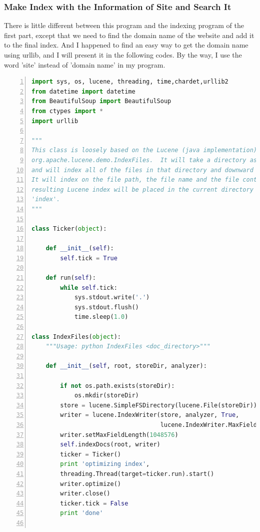 \documentclass{article}
\begin{document}
\subsubsection{Make Index with the Information of Site and Search It}
There is little different between this program and the indexing program of the first part, except that we need to find the domain name of the website and add it to the final index. And I happened to find an easy way to get the domain name using urllib, and I will present it in the following codes. By the way, I use the word 'site' instead of 'domain name' in my program.\\
\begin{lstlisting}[language=python,numbers=left,frame=leftline]
import sys, os, lucene, threading, time,chardet,urllib2
from datetime import datetime
from BeautifulSoup import BeautifulSoup
from ctypes import *
import urllib

"""
This class is loosely based on the Lucene (java implementation) demo class
org.apache.lucene.demo.IndexFiles.  It will take a directory as an argument
and will index all of the files in that directory and downward recursively.
It will index on the file path, the file name and the file contents.  The
resulting Lucene index will be placed in the current directory and called
'index'.
"""

class Ticker(object):

    def __init__(self):
        self.tick = True

    def run(self):
        while self.tick:
            sys.stdout.write('.')
            sys.stdout.flush()
            time.sleep(1.0)

class IndexFiles(object):
    """Usage: python IndexFiles <doc_directory>"""

    def __init__(self, root, storeDir, analyzer):

        if not os.path.exists(storeDir):
            os.mkdir(storeDir)
        store = lucene.SimpleFSDirectory(lucene.File(storeDir))
        writer = lucene.IndexWriter(store, analyzer, True,
                                    lucene.IndexWriter.MaxFieldLength.LIMITED)
        writer.setMaxFieldLength(1048576)
        self.indexDocs(root, writer)
        ticker = Ticker()
        print 'optimizing index',
        threading.Thread(target=ticker.run).start()
        writer.optimize()
        writer.close()
        ticker.tick = False
        print 'done'


\end{lstlisting}
\end{document}
